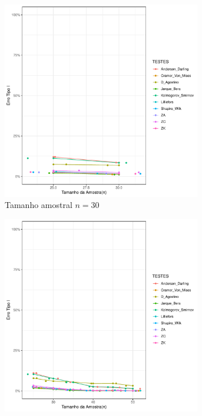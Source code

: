 \documentclass[a4paper,11pt]{article} %
\begin{document}
\begin{figure}[H]
    \centering
    \caption{Comparação do Erro Tipo I dos testes AD, CM, DG, LL, JB, KS, LL, ZA, ZC e ZK em função do tamanho amostral para a \textbf{Distribuição} $\textbf{Cauchy}(0, 1)$.}
    \label{fig:erro_tipo_I_dist_cauchy}
    
    \begin{subfigure}[b]{0.45\textwidth}
        \centering
    \includegraphics[width=0.95\textwidth]{Distribuição Cauchy/Erro Tipo I/erro_tipo_I_cauchy_30.pdf}
        \caption{Tamanho amostral \(n = 30\)}
        \label{fig:cauchy_30}
    \end{subfigure}
    \hfill
    \begin{subfigure}[b]{0.45\textwidth}
        \centering
        \includegraphics[width=0.95\textwidth]{Distribuição Cauchy/Erro Tipo I/erro_tipo_I_cauchy_50.pdf}

\end{subfigure}
\end{figure}
\end{document}
